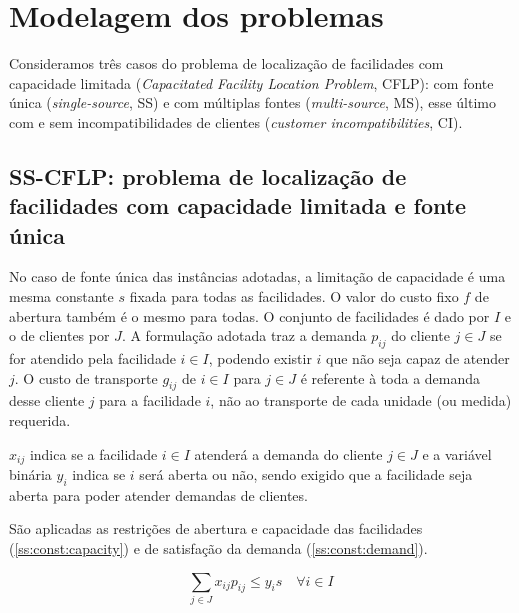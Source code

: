 \documentclass[]{article}
\title{}
\author{Guilherme Akira Demenech Mori}
\begin{document}
\maketitle

\begin{abstract}

\end{abstract}

\section{Modelagem dos problemas}

	Consideramos três casos do problema de localização de facilidades com capacidade limitada 
	(\textit{Capacitated Facility Location Problem}, CFLP):
	com fonte única (\textit{single-source}, SS) 
	e com múltiplas fontes (\textit{multi-source}, MS), 
    esse último com e sem incompatibilidades de clientes (\textit{customer incompatibilities}, CI). 
	
\subsection{SS-CFLP: problema de localização de facilidades com capacidade limitada e fonte única}
	
	No caso de fonte única das instâncias adotadas, a limitação de capacidade é uma mesma constante $s$ fixada para todas as facilidades.
	O valor do custo fixo $f$ de abertura também é o mesmo para todas.
	O conjunto de facilidades é dado por $I$ e o de clientes por $J$.
	A formulação adotada traz a demanda $p_{ij}$ do cliente $j \in J$ se for atendido pela facilidade $i \in I$, 
	podendo existir $i$ que não seja capaz de atender $j$.
	O custo de transporte $g_{ij}$ de $i \in I$ para $j \in J$ é referente à toda a demanda desse cliente $j$ para a facilidade $i$, não ao transporte de cada unidade (ou medida) requerida.
	
	$x_{ij}$ indica se a facilidade $i \in I$ atenderá a demanda do cliente $j \in J$ 
	e a variável binária $y_i$ indica se $i $ será aberta ou não, sendo exigido que a facilidade seja aberta para poder atender demandas de clientes.
	
	São aplicadas as restrições de abertura e capacidade das facilidades (\ref{ss:const:capacity}) e de satisfação da demanda (\ref{ss:const:demand}).
	
	\begin{equation}
		\label{ss:const:capacity}		
		\sum_{j \in J} x_{ij} p_{ij} \le y_i s 
		\quad
		\forall i \in I
	\end{equation}	
\end{document}

